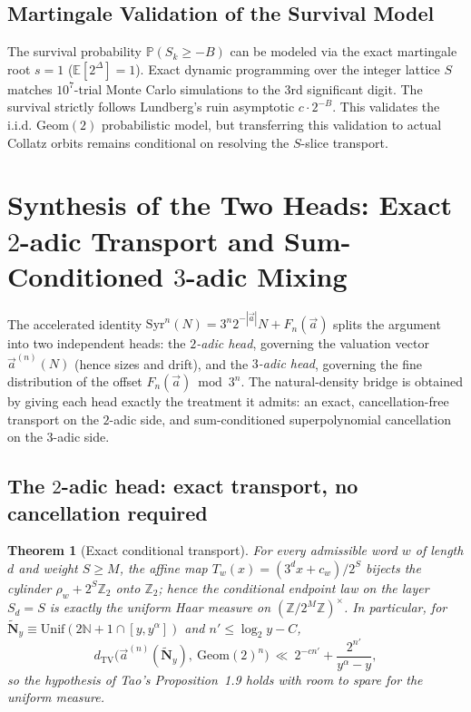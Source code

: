 \documentclass[12pt,a4paper]{article}
\newtheorem{theorem}{Theorem}[section]
\begin{document}
\subsection{Martingale Validation of the Survival Model}

The survival probability $\mathbb{P}(S_k \ge -B)$ can be modeled via the exact martingale root $s=1$ ($\mathbb{E}[2^\Delta] = 1$). Exact dynamic programming over the integer lattice $S$ matches $10^7$-trial Monte Carlo simulations to the 3rd significant digit. The survival strictly follows Lundberg's ruin asymptotic $c \cdot 2^{-B}$. This validates the i.i.d. $\mathrm{Geom}(2)$ probabilistic model, but transferring this validation to actual Collatz orbits remains conditional on resolving the $S$-slice transport.



\section{Synthesis of the Two Heads: Exact $2$-adic Transport and Sum-Conditioned $3$-adic Mixing}
\label{sec:synthesis}

The accelerated identity $\mathrm{Syr}^n(N)=3^n2^{-|\vec a|}N+F_n(\vec a)$ splits the
argument into two independent heads: the \emph{$2$-adic head}, governing the
valuation vector $\vec a^{(n)}(N)$ (hence sizes and drift), and the
\emph{$3$-adic head}, governing the fine distribution of the offset
$F_n(\vec a)\bmod 3^n$. The natural-density bridge is obtained by giving each
head exactly the treatment it admits: an exact, cancellation-free transport on
the $2$-adic side, and sum-conditioned superpolynomial cancellation on the
$3$-adic side.

\subsection{The $2$-adic head: exact transport, no cancellation required}

\begin{theorem}[Exact conditional transport]
For every admissible word $w$ of length $d$ and weight $S\ge M$, the affine map
$T_w(x)=(3^dx+c_w)/2^S$ bijects the cylinder $\rho_w+2^S\mathbb Z_2$ onto
$\mathbb Z_2$; hence the conditional endpoint law on the layer $S_d=S$ is
exactly the uniform Haar measure on $(\mathbb Z/2^M\mathbb Z)^\times$. In
particular, for $\widetilde{\mathbf N}_y\equiv\mathrm{Unif}(2\mathbb N+1\cap[y,y^\alpha])$
and $n'\le\log_2 y-C$,
\[
d_{\mathrm{TV}}\big(\vec a^{(n)}(\widetilde{\mathbf N}_y),\ \mathrm{Geom}(2)^n\big)
\ \ll\ 2^{-cn'}+\frac{2^{n'}}{y^\alpha-y},
\]
so the hypothesis of Tao's Proposition~1.9 holds with room to spare for the
uniform measure.
\end{theorem}
\end{document}
